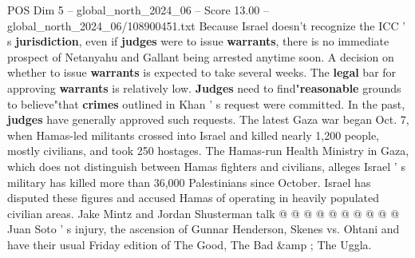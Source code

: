 \begin{textsample}{POS Dim 5 – global\_north\_2024\_06 – Score 13.00 – global\_north\_2024\_06/108900451.txt}
Because Israel doesn't recognize the ICC ' s \textbf{jurisdiction}, even if \textbf{judges} were to issue \textbf{warrants}, there is no immediate prospect of Netanyahu and Gallant being arrested anytime soon.
A decision on whether to issue \textbf{warrants} is expected to take several weeks.
The \textbf{legal} bar for approving \textbf{warrants} is relatively low. \textbf{Judges} need to find"\textbf{reasonable} grounds to believe"that \textbf{crimes} outlined in Khan ' s request were committed.
In the past, \textbf{judges} have generally approved such requests.
The latest Gaza war began Oct. 7, when Hamas-led militants crossed into Israel and killed nearly 1,200 people, mostly civilians, and took 250 hostages.
The Hamas-run Health Ministry in Gaza, which does not distinguish between Hamas fighters and civilians, alleges Israel ' s military has killed more than 36,000 Palestinians since October.
Israel has disputed these figures and accused Hamas of operating in heavily populated civilian areas.
Jake Mintz and Jordan Shusterman talk @ @ @ @ @ @ @ @ @ @ Juan Soto ' s injury, the ascension of Gunnar Henderson, Skenes vs.
Ohtani and have their usual Friday edition of The Good, The Bad \&amp ; The Uggla.

\end{textsample}
